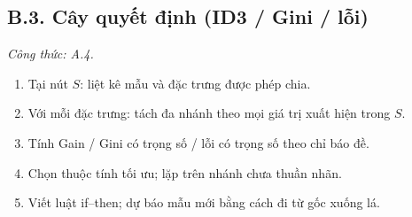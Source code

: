 \subsection*{B.3. Cây quyết định (ID3 / Gini / lỗi)}
\textit{Công thức: A.4.}
\begin{enumerate}
  \item Tại nút \(S\): liệt kê mẫu và đặc trưng được phép chia.
  \item Với mỗi đặc trưng: tách đa nhánh theo mọi giá trị xuất hiện trong \(S\).
  \item Tính Gain / Gini có trọng số / lỗi có trọng số theo chỉ báo đề.
  \item Chọn thuộc tính tối ưu; lặp trên nhánh chưa thuần nhãn.
  \item Viết luật if--then; dự báo mẫu mới bằng cách đi từ gốc xuống lá.
\end{enumerate}
